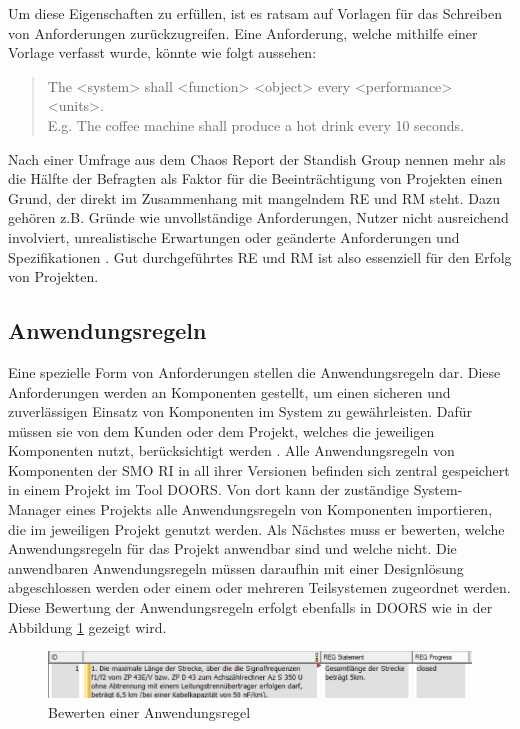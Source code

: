 Um diese Eigenschaften zu erfüllen, ist es ratsam auf Vorlagen für das Schreiben von Anforderungen zurückzugreifen. Eine Anforderung, welche mithilfe
einer Vorlage verfasst wurde, könnte wie folgt aussehen:
\begin{quote}
    \glqq The <system> shall <function> <object> every <performance> <units>.\\
    E.g. The coffee machine shall produce a hot drink every 10 seconds. \grqq{} \cite[S.81]{DOORS}
\end{quote}

Nach einer Umfrage aus dem Chaos Report der Standish Group nennen mehr als die Hälfte der Befragten als Faktor für die Beeinträchtigung von Projekten
einen Grund, der direkt im Zusammenhang mit mangelndem \ac{RE} und \ac{RM} steht. Dazu gehören z.B. Gründe wie unvollständige Anforderungen, Nutzer nicht
ausreichend involviert, unrealistische Erwartungen oder geänderte Anforderungen und Spezifikationen \cite[vgl. S.5]{Chaos}. Gut durchgeführtes 
\ac{RE} und \ac{RM} ist also essenziell für den Erfolg von Projekten.

\subsection{Anwendungsregeln}
Eine spezielle Form von Anforderungen stellen die Anwendungsregeln dar. Diese Anforderungen werden an Komponenten gestellt, um einen sicheren
und zuverlässigen Einsatz von Komponenten im System zu gewährleisten. Dafür müssen sie von dem Kunden oder dem Projekt, welches die jeweiligen 
Komponenten nutzt, berücksichtigt werden \cite[vgl. S.9]{SMO-AR}. Alle Anwendungsregeln von Komponenten der \ac{SMO RI} in all ihrer Versionen
befinden sich zentral gespeichert in einem Projekt im Tool \ac{DOORS}. Von dort kann der zuständige System-Manager eines Projekts alle 
Anwendungsregeln von Komponenten importieren, die im jeweiligen Projekt genutzt werden. Als Nächstes muss er bewerten, welche 
Anwendungsregeln für das Projekt anwendbar sind und welche nicht. Die anwendbaren Anwendungsregeln müssen daraufhin mit einer Designlösung
abgeschlossen werden oder einem oder mehreren Teilsystemen zugeordnet werden. Diese Bewertung der Anwendungsregeln erfolgt ebenfalls in \ac{DOORS}
wie in der Abbildung \ref*{fig:BewerteteAR} gezeigt wird.

\begin{figure}[H]
    \centering
    \includegraphics[width = \textwidth]{abbildungen/Bewertete AR.png}
    \caption{Bewerten einer Anwendungsregel}
    \label{fig:BewerteteAR}
\end{figure}

